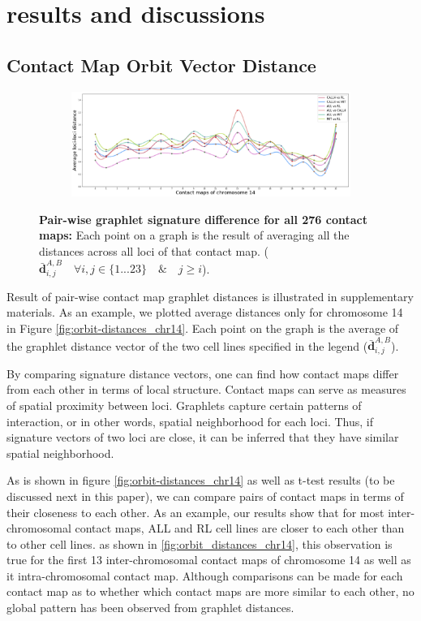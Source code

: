 \documentclass[a4,center,fleqn]{NAR}
\begin{document}
\section{results and discussions}
\subsection{Contact Map Orbit Vector Distance}
\begin{figure}
    \centering
    \begin{subfigure}[b]{\textwidth}
        \includegraphics[width=\textwidth]{figures/orbit-distances_chr14.png}
    \end{subfigure}
    \caption{   
        \textbf{Pair-wise graphlet signature difference for
        all 276 contact maps:}
        Each point on a graph is the result of averaging all
        the distances across all loci of that contact map.
        ($\bar{\mathbf{d}}^{\scriptscriptstyle A,B}_{i,j} \quad
        \forall i,j \in \{1 ... 23\} \quad \& \quad j \ge i$).  
     }
    \label{fig:results_all}
\end{figure}

Result of pair-wise contact map graphlet distances is
illustrated in supplementary materials. 
As an example, we plotted average
distances only for chromosome 
14 in Figure \ref{fig:orbit-distances_chr14}.
Each point on the graph is the
average of the graphlet distance vector 
of the two cell lines specified in the legend
($\bar{\mathbf{d}}^{\scriptscriptstyle A,B}_{i,j}$).

By comparing signature distance vectors, one can find
how contact maps
differ from each other in terms of local structure. 
Contact maps can serve as measures of spatial proximity between
loci. Graphlets capture certain patterns of interaction, or
in other words, spatial neighborhood for each loci. Thus, if
signature vectors of two loci are close,
 it can be inferred that they have 
similar spatial neighborhood.

As is shown in
figure \ref{fig:orbit-distances_chr14} as well as t-test results
(to be discussed next in this paper),
we can compare pairs of contact maps in terms of their closeness
to each other. 
As an example, our results show that
for most inter-chromosomal contact maps, ALL
and RL cell lines are closer to each other than to other
cell lines. as  shown in 
\ref{fig:orbit_distances_chr14}, this observation is
true for the first 13 inter-chromosomal 
contact maps of chromosome 14 as well as it intra-chromosomal
contact map.
Although comparisons can be made for each contact map as to
whether which contact maps are more similar to each other,
no global pattern has been observed from graphlet distances.
\end{document}
